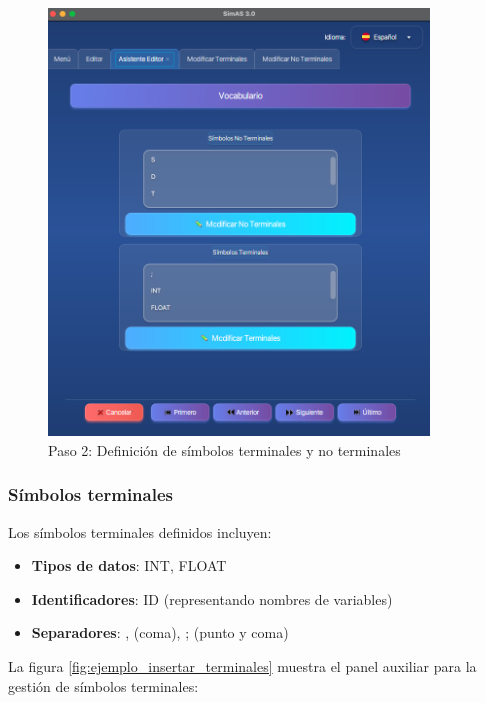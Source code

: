 \needspace{8cm}
\begin{figure}[H]
    \centering
    \includegraphics[width=0.9\textwidth]{figuras/ejemplo_practico/editor_paso2.png}
    \caption{Paso 2: Definición de símbolos terminales y no terminales}
    \label{fig:ejemplo_editor_paso2}
\end{figure}

\subsubsection{Símbolos terminales}

Los símbolos terminales definidos incluyen:
\begin{itemize}
    \item \textbf{Tipos de datos}: INT, FLOAT
    \item \textbf{Identificadores}: ID (representando nombres de variables)
    \item \textbf{Separadores}: , (coma), ; (punto y coma)
\end{itemize}

La figura \ref{fig:ejemplo_insertar_terminales} muestra el panel auxiliar para la gestión de símbolos terminales:

